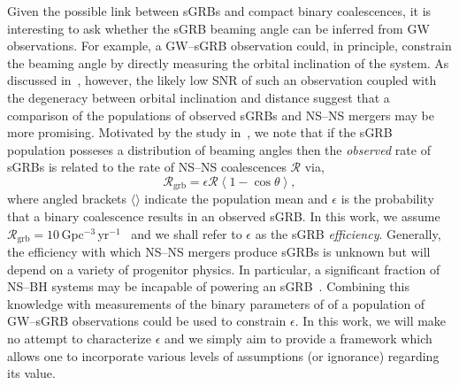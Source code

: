 \documentclass[twocolumn,nofootinbib]{revtex4-1}
\newcommand{\grbrate}{{{\mathcal R}_{\mathrm{grb}}}}
\newcommand{\cbcrate}{{{\mathcal R}}}
\newcommand{\BNS}{\ac{NS}--\ac{NS}\xspace}
\newcommand{\NSBH}{\ac{NS}--\ac{BH}\xspace}
\newcommand{\JOINT}{\ac{GW}--\ac{sGRB}\xspace}
\begin{document}
Given the possible link between \acp{sGRB} and compact binary
coalescences, it is interesting to ask whether the \ac{sGRB} beaming
angle can be inferred from \ac{GW} observations.  For example, a
\JOINT observation could, in principle, constrain the beaming angle by
directly measuring the orbital inclination of the system.  As
discussed in~\cite{Clark:2014jpa}, however, the likely low \ac{SNR} of
such an observation coupled with the degeneracy between orbital
inclination and distance suggest that a comparison of the populations
of observed \acp{sGRB} and \BNS mergers may be more promising.
Motivated by the study in~\cite{2013PhRvL.111r1101C}, we note that if
the \ac{sGRB} population posseses a distribution of beaming angles
then the \emph{observed} rate of \acp{sGRB} is related to the rate of
\BNS coalescences $\cbcrate$ via,
%
\begin{equation}\label{eq:rate2angle}
    \grbrate = \epsilon\cbcrate \left \langle 1-\cos \theta \right \rangle,
\end{equation}
%
where angled brackets $\langle \rangle$ indicate the population mean
and $\epsilon$ is the probability that a binary coalescence results in
an observed \ac{sGRB}.  In this work, we assume
$\grbrate=10$\,Gpc$^{-3}$\,yr$^{-1}$~\cite{Nakar:2007yr,Dietz:2010eh}
and we shall refer to $\epsilon$ as the \ac{sGRB} \emph{efficiency}.
Generally, the efficiency with which \BNS mergers produce \acp{sGRB}
is unknown but will depend on a variety of progenitor physics.  In
particular, a significant fraction of \NSBH systems may be incapable
of powering an \ac{sGRB}~\cite{Pannarale:2014rea}.  Combining this
knowledge with measurements of the binary parameters of of a
population of \JOINT observations could be used to constrain
$\epsilon$.  In this work, we will make no attempt to characterize
$\epsilon$ and we simply aim to provide a framework which allows one
to incorporate various levels of assumptions (or ignorance) regarding
its value.
\end{document}
